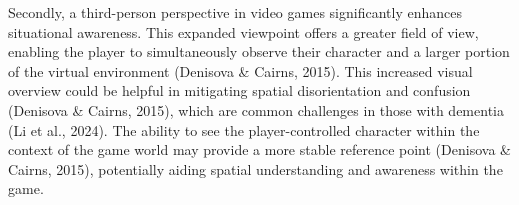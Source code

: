 \documentclass{l4proj}
\begin{document}
Secondly, a third-person perspective in video games significantly enhances situational awareness. This expanded viewpoint offers a greater field of view, enabling the player to simultaneously observe their character and a larger portion of the virtual environment (Denisova \& Cairns, 2015). This increased visual overview could be helpful in mitigating spatial disorientation and confusion (Denisova \& Cairns, 2015), which are common challenges in those with dementia (Li et al., 2024). The ability to see the player-controlled character within the context of the game world may provide a more stable reference point (Denisova \& Cairns, 2015), potentially aiding spatial understanding and awareness within the game.






\end{document}
